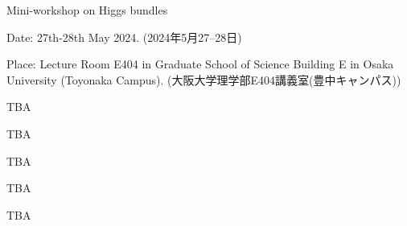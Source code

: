\documentclass[dvipdfmx,a4paper,12pt]{article}
\theoremstyle{plain} %
\theoremstyle{definition} %
\begin{document}
\begin{center}
  {\Huge Mini-workshop on Higgs bundles}
 

  \end{center}
  
\vskip5mm
\begin{flushleft}
{ Date: 27th-28th May 2024. (2024年5月27--28日)}


{Place: Lecture Room E404 in Graduate School of Science Building E in Osaka University (Toyonaka Campus).}
{(大阪大学理学部E404講義室(豊中キャンパス))}

\end{flushleft}




\vskip8mm

\vskip3mm
\vskip1mm
TBA
\vskip3mm

TBA
\vskip3mm

TBA
\vskip3mm

TBA

\vskip6mm
\vskip1mm
TBA
\end{document}
